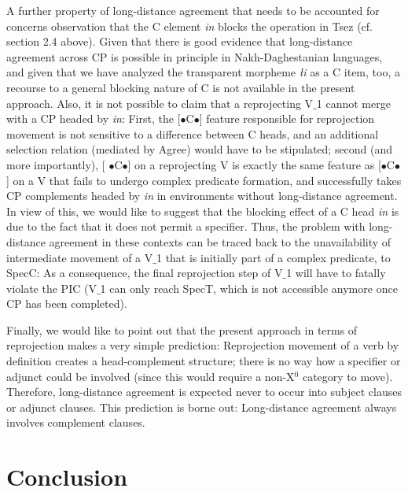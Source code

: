 \documentclass[output=paper
,modfonts
,nonflat]{langsci/langscibook}
\begin{document}
A further property of long-distance agreement that needs to be
accounted for concerns  observation
that the C element {\itshape \textcrlambda in} blocks the operation in Tsez
(cf. section 2.4 above). Given that there is good evidence that
long-distance agreement across CP is possible in principle in
Nakh-Daghestanian languages, and given that we have analyzed the
transparent morpheme {\itshape {\l}i} as a C item, too, a recourse to a
general blocking nature of C is not available in the present
approach. Also, it is not possible to claim that a reprojecting V$\_$1
cannot merge with a CP headed by {\itshape \textcrlambda in}: First, the
[{\small $\bullet$}C{\small $\bullet$}] feature responsible for
reprojection movement is not sensitive to a difference between C
heads, and an additional selection relation (mediated by Agree) would
have to be stipulated; second (and more importantly), [{\small
    $\bullet$}C{\small $\bullet$}] on a reprojecting V is exactly the
same feature as [{\small $\bullet$}C{\small $\bullet$}] on a V that
fails to undergo complex predicate formation, and successfully takes
CP complements headed by {\itshape \textcrlambda in} in environments
without long-distance agreement. In view of this, we would like to
suggest that the blocking effect of a C head {\itshape \textcrlambda in} is
due to the fact that it does not permit a specifier. Thus, the problem
with long-distance agreement in these contexts can be traced back to
the unavailability of intermediate movement of a V$\_$1 that is initially
part of a complex predicate, to SpecC: As a consequence, the final
reprojection step of V$\_$1 will have to fatally violate the PIC (V$\_$1
can only reach SpecT, which is not accessible anymore once CP has been
completed).

Finally, we would like to point out that the present approach in terms
of reprojection makes a very simple prediction: Reprojection movement
of a verb by definition creates a head-complement structure; there is
no way how a specifier or adjunct could be involved (since this would
require a non-X$^0$ category to move). Therefore, long-distance
agreement is expected never to occur into subject clauses or adjunct
clauses.  This prediction is borne out: Long-distance agreement always
involves complement clauses.


\section{Conclusion}
\end{document}
